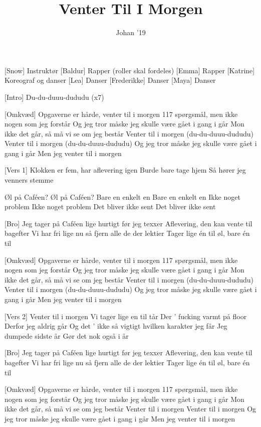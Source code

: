 \documentclass[a4paper,11pt]{article}
\title{Venter Til I Morgen}
\author{Johan ’19}
\begin{document}
\maketitle

\begin{roles}
[Snow] Instruktør
[Baldur] Rapper (roller skal fordeles)
[Emma] Rapper
[Katrine] Koreograf og danser
[Lea] Danser
[Frederikke] Danser
[Maya] Danser
\end{roles}

\begin{song}
[Intro] Du-du-duuu-dududu (x7)


[Omkvæd] Opgaverne er hårde, venter til i morgen
117 spørgsmål, men ikke nogen som jeg forstår
Og jeg tror måske jeg skulle være gået i gang i går
Mon ikke det går, så må vi se om jeg består
Venter til i morgen (du-du-duuu-dududu)
Venter til i morgen (du-du-duuu-dududu)
Og jeg tror måske jeg skulle være gået i gang i går
Men jeg venter til i morgen

[Vers 1] Klokken er fem, har aflevering igen
Burde bare tage hjem
Så hører jeg venners stemme

 Øl på Caféen?
 Øl på Caféen?
 Bare en enkelt en
 Bare en enkelt en
 Ikke noget problem
 Ikke noget problem
 Det bliver ikke sent
 Det bliver ikke sent

[Bro] Jeg tager på Caféen lige hurtigt før jeg texxer
Aflevering, den kan vente til bagefter
Vi har fri lige nu så fjern alle de der lektier
Tager lige én til øl, bare én til


[Omkvæd] Opgaverne er hårde, venter til i morgen
117 spørgsmål, men ikke nogen som jeg forstår
Og jeg tror måske jeg skulle være gået i gang i går
Mon ikke det går, så må vi se om jeg består
Venter til i morgen (du-du-duuu-dududu)
Venter til i morgen (du-du-duuu-dududu)
Og jeg tror måske jeg skulle være gået i gang i går
Men jeg venter til i morgen

[Vers 2] Venter til i morgen
Vi tager lige en til tår
Der ’ fucking varmt på floor
Derfor jeg aldrig går
Og det ’ ikke så vigtigt hvilken karakter jeg får
Jeg dumpede sidste år
Gør det nok også i år

[Bro] Jeg tager på Caféen lige hurtigt før jeg texxer
Aflevering, den kan vente til bagefter
Vi har fri lige nu så fjern alle de der lektier
Tager lige én til øl, bare én til

[Omkvæd] Opgaverne er hårde, venter til i morgen
117 spørgsmål, men ikke nogen som jeg forstår
Og jeg tror måske jeg skulle være gået i gang i går
Mon ikke det går, så må vi se om jeg består
Venter til i morgen
Venter til i morgen
Og jeg tror måske jeg skulle være gået i gang i går
Men jeg venter til i morgen
\end{song}
\end{document}
